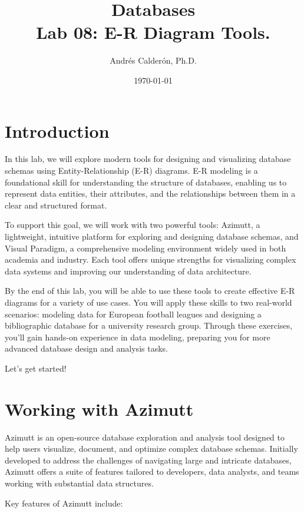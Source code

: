 \documentclass{article}
\title{Databases \\ Lab 08: E-R Diagram Tools.}
\author{Andrés Calderón, Ph.D.}
\date{\today}
\begin{document}
\maketitle

\section{Introduction}
In this lab, we will explore modern tools for designing and visualizing database schemas using Entity-Relationship (E-R) diagrams. E-R modeling is a foundational skill for understanding the structure of databases, enabling us to represent data entities, their attributes, and the relationships between them in a clear and structured format.

To support this goal, we will work with two powerful tools: Azimutt, a lightweight, intuitive platform for exploring and designing database schemas, and Visual Paradigm, a comprehensive modeling environment widely used in both academia and industry. Each tool offers unique strengths for visualizing complex data systems and improving our understanding of data architecture.

By the end of this lab, you will be able to use these tools to create effective E-R diagrams for a variety of use cases. You will apply these skills to two real-world scenarios: modeling data for European football leagues and designing a bibliographic database for a university research group. Through these exercises, you'll gain hands-on experience in data modeling, preparing you for more advanced database design and analysis tasks.

Let’s get started!

\section{Working with Azimutt} \label{sec:azimutt}
Azimutt is an open-source database exploration and analysis tool designed to help users visualize, document, and optimize complex database schemas. Initially developed to address the challenges of navigating large and intricate databases, Azimutt offers a suite of features tailored to developers, data analysts, and teams working with substantial data structures.

Key features of Azimutt include:
\end{document}

